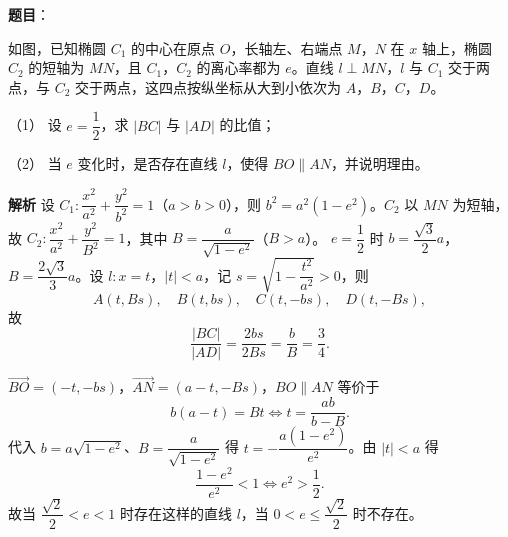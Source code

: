\begin{answer}

\textbf{题目}：

如图，已知椭圆 $C_1$ 的中心在原点 $O$，长轴左、右端点 $M$，$N$ 在 $x$ 轴上，椭圆 $C_2$ 的短轴为 $MN$，且 $C_1$，$C_2$ 的离心率都为 $e$。直线 $l\perp MN$，$l$ 与 $C_1$ 交于两点，与 $C_2$ 交于两点，这四点按纵坐标从大到小依次为 $A$，$B$，$C$，$D$。

（1） 设 $e=\dfrac12$，求 $|BC|$ 与 $|AD|$ 的比值；

（2） 当 $e$ 变化时，是否存在直线 $l$，使得 $BO\parallel AN$，并说明理由。
\nopagebreak[4]
\begin{center}\end{center}
\nopagebreak[4]
\textbf{解析}
设 $C_1:\dfrac{x^2}{a^2}+\dfrac{y^2}{b^2}=1$（$a>b>0$），则 $b^2=a^2(1-e^2)$。$C_2$ 以 $MN$ 为短轴，故 $C_2:\dfrac{x^2}{a^2}+\dfrac{y^2}{B^2}=1$，其中 $B=\dfrac a{\sqrt{1-e^2}}$（$B>a$）。
$e=\dfrac12$ 时 $b=\dfrac{\sqrt3}2a$，$B=\dfrac{2\sqrt3}3a$。设 $l:x=t$，$|t|<a$，记 $s=\sqrt{1-\dfrac{t^2}{a^2}}>0$，则
\nopagebreak[4]
\[A(t,Bs),\quad B(t,bs),\quad C(t,-bs),\quad D(t,-Bs),\]
故
\nopagebreak[4]
\[\frac{|BC|}{|AD|}=\frac{2bs}{2Bs}=\frac bB=\frac34.\]

$\overrightarrow{BO}=(-t,-bs)$，$\overrightarrow{AN}=(a-t,-Bs)$，$BO\parallel AN$ 等价于
\nopagebreak[4]
\[b(a-t)=Bt\Longleftrightarrow t=\frac{ab}{b-B}.\]
代入 $b=a\sqrt{1-e^2}$、$B=\dfrac a{\sqrt{1-e^2}}$ 得 $t=-\dfrac{a(1-e^2)}{e^2}$。由 $|t|<a$ 得
\nopagebreak[4]
\[\frac{1-e^2}{e^2}<1\Longleftrightarrow e^2>\frac12.\]
故当 $\dfrac{\sqrt2}2<e<1$ 时存在这样的直线 $l$，当 $0<e\leqslant\dfrac{\sqrt2}2$ 时不存在。



\end{answer}
